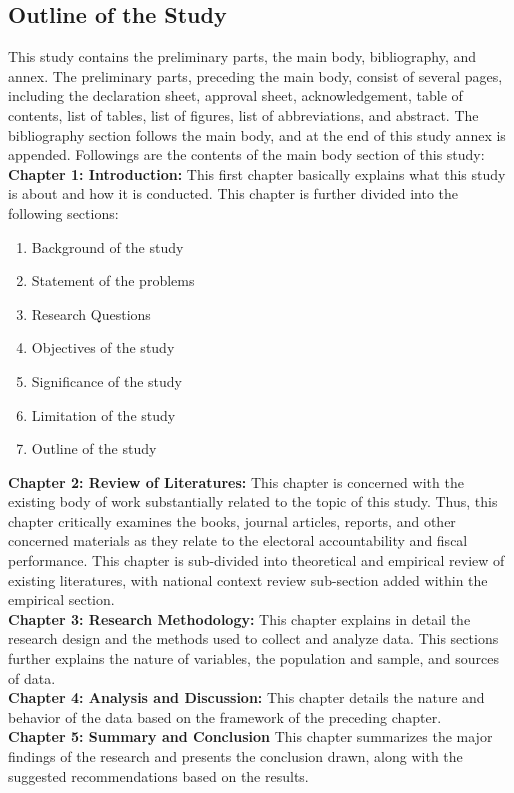 \subsection{Outline of the Study} 
This study contains the preliminary parts, the main body, bibliography, and annex. The preliminary parts, preceding the main body, consist of several pages, including the declaration sheet, approval sheet, acknowledgement, table of contents, list of tables, list of figures, list of abbreviations, and abstract. The bibliography section follows the main body, and at the end of this study annex is appended. Followings are the contents of the main body section of this study:\\
\textbf{{Chapter 1}: \hspace{0.75mm} Introduction:}\hspace{3mm} This first chapter basically explains what this study is about and how it is conducted. This chapter is further divided into the following sections:  
\begin{enumerate}[label=\roman*.]  
     \item Background of the study
    \item Statement of the problems
    \item Research Questions
    \item Objectives of the study
    \item Significance of the study
    \item Limitation of the study
    \item Outline of the study
\end{enumerate}
\textbf{{Chapter 2}: \hspace{0.75mm}Review of Literatures:}\hspace{3mm} This chapter is concerned with the existing body of work substantially related to the topic of this study. Thus, this chapter critically examines the books, journal articles, reports, and other concerned materials as they relate to the electoral accountability and fiscal performance. This chapter is sub-divided into theoretical and empirical review of existing literatures, with national context review sub-section added within the empirical section.\\
\textbf{{Chapter 3}: \hspace{0.75mm}Research Methodology:}\hspace{3mm} This chapter explains in detail the research design and the methods used to collect and analyze data. This sections further explains the nature of variables, the population and sample, and sources of data.\\
\textbf{{Chapter 4}: \hspace{0.75mm}Analysis and Discussion:}\hspace{3mm} This chapter details the nature and behavior of the data based on the framework of the preceding chapter. \\
\textbf{{Chapter 5}: \hspace{0.75mm}Summary and Conclusion}\hspace{3mm} This chapter summarizes the major findings of the research and presents the conclusion drawn, along with the suggested recommendations based on the results. 
